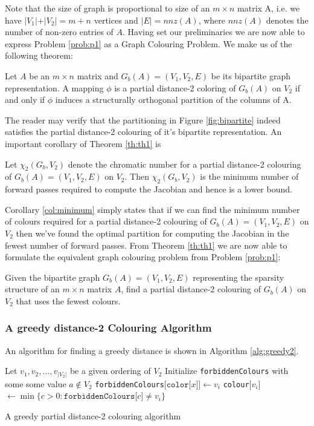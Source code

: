 Note that the size of graph is proportional to size of an $m \times n$ matrix A, i.e. we have $\vert V_1 \vert  + \vert V_2 \vert = m + n$ vertices and $\vert E \vert = nnz(A)$, where $nnz(A)$ denotes the number of non-zero entries of $A$. Having set our preliminaries we are now able to express Problem
\ref{prob:p1} as a Graph Colouring Problem. We make us of the following theorem:
\begin{theorem}
	Let $A$ be an $m \times n$ matrix and $G_b(A) = (V_1, V_2, E)$ be its bipartite graph representation. A mapping $\phi$ is a partial distance-2 coloring of $G_b(A)$ on $V_2$ if and only if $\phi$ induces a structurally orthogonal partition of the columns of A. 
	\label{th:th1}
\end{theorem}
The reader may verify that the partitioning in Figure \ref{fig:bipartite} indeed satisfies the partial distance-2 colouring of 
it's bipartite representation. An important corollary of Theorem \ref{th:th1} is 
\begin{corollary}
	Let $\chi_2(G_b, V_2)$ denote the chromatic number for a partial distance-2 colouring of $G_b(A) = (V_1, V_2, E)$  on $V_2$. 
	Then $\chi_2(G_b, V_2)$ is the minimum number of forward passes required to compute the Jacobian and hence is a lower bound. 
	\label{col:minimum}
\end{corollary}
Corollary \ref{col:minimum} simply states that if we can find the minimum number of colours required for a partial distance-2 colouring of $G_b(A) = (V_1, V_2, E)$  on $V_2$  then we've found the optimal partition for computing the  Jacobian in the fewest number of forward passes. From Theorem \ref{th:th1} we are now able to formulate the equivalent graph colouring problem from Problem \ref{prob:p1}:
\begin{problem}
	Given the bipartite graph $G_b(A) = (V_1, V_2, E)$ representing the sparsity structure of an $m \times n$ matrix $A$, find a partial distance-2 colouring of $G_b(A)$ on $V_2$ that uses the fewest colours. 
\end{problem} 


\subsubsection{A greedy distance-2 Colouring Algorithm}
An algorithm for finding a greedy distance is shown in Algorithm \ref{alg:greedy2}.\newline 
\begin{algorithm}[H]
	\SetAlgoLined
	Let $v_1, v_2, ..., v_{\vert V_2 \vert}$ be a given ordering of $V_2$\;
	Initialize \texttt{forbiddenColours} with some some value $a \not\in V_2$\;
	{
		{
			{
				\texttt{forbiddenColours}$\lbrack \texttt{color} \lbrack x \rbrack \rbrack \leftarrow v_i$
    		}
	    }  
        \texttt{colour}$\lbrack v_i \rbrack$ $\leftarrow \min \{ c > 0 : \texttt{forbiddenColours}\lbrack c \rbrack \not= v_i \}$
    }	
	\caption{A greedy partial distance-2 colouring algorithm}
	\label{alg:greedy2}
\end{algorithm}




